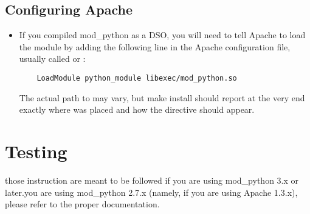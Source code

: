 \subsection{Configuring Apache\label{inst-apacheconfig}}

\begin{itemize}

\item
  If you compiled mod_python as a DSO, you will need to tell Apache to
  load the module by adding the following line in the Apache
  configuration file, usually called  or
  :

  \begin{verbatim}
    LoadModule python_module libexec/mod_python.so
  \end{verbatim}

  The actual path to  may vary, but make install
  should report at the very end exactly where 
  was placed and how the  directive should appear.

\end{itemize}

\section{Testing\label{inst-testing}}

 those instruction are meant to be followed if you are
using mod_python 3.x or later.\If you are using mod_python 2.7.x (namely,
if you are using Apache 1.3.x), please refer to the proper documentation.

